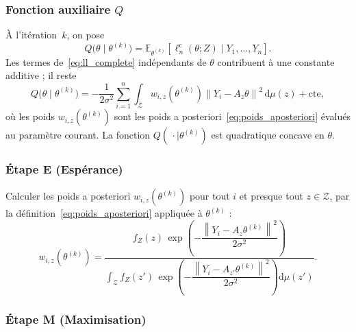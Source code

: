 \documentclass[12pt, a4paper]{article}
\theoremstyle{definition}
\newcommand{\E}{\mathbb{E}}
\newcommand{\Zcal}{\mathcal{Z}}
\newcommand{\norm}[1]{\left\|#1\right\|}
\begin{document}
\subsubsection{Fonction auxiliaire $Q$}

À l'itération~$k$, on pose
\begin{equation}
    Q\bigl(\theta \mid \theta^{(k)}\bigr)
    = \E_{\theta^{(k)}}\!\left[\ell_n^{\mathrm{c}}(\theta; Z) \;\Big|\; Y_1, \ldots, Y_n\right].
    \label{eq:Q_function}
\end{equation}
Les termes de~\eqref{eq:ll_complete} indépendants de $\theta$ contribuent à une constante additive ; il reste
\begin{equation}
    Q\bigl(\theta \mid \theta^{(k)}\bigr)
    = -\frac{1}{2\sigma^2}
      \sum_{i=1}^{n} \int_\Zcal w_{i,z}\!\left(\theta^{(k)}\right)
      \norm{Y_i - A_z\theta}^2\,\mathrm{d}\mu(z)
      + \mathrm{cte},
    \label{eq:Q_explicite}
\end{equation}
où les poids $w_{i,z}(\theta^{(k)})$ sont les poids a posteriori~\eqref{eq:poids_aposteriori} évalués au paramètre courant. La fonction $Q(\,\cdot \mid \theta^{(k)})$ est quadratique concave en $\theta$.

\subsubsection{Étape E (Espérance)}

Calculer les poids a posteriori $w_{i,z}(\theta^{(k)})$ pour tout $i$ et presque tout $z \in \Zcal$, par la définition~\eqref{eq:poids_aposteriori} appliquée à $\theta^{(k)}$ :
\begin{equation}
    w_{i,z}\!\left(\theta^{(k)}\right)
    = \frac{f_Z(z)\,\exp\!\left(-\dfrac{\norm{Y_i - A_z\theta^{(k)}}^2}{2\sigma^2}\right)}
           {\displaystyle\int_\Zcal f_Z(z')\,\exp\!\left(-\dfrac{\norm{Y_i - A_{z'}\theta^{(k)}}^2}{2\sigma^2}\right)\mathrm{d}\mu(z')}.
    \label{eq:estep}
\end{equation}

\subsubsection{Étape M (Maximisation)}
\end{document}
